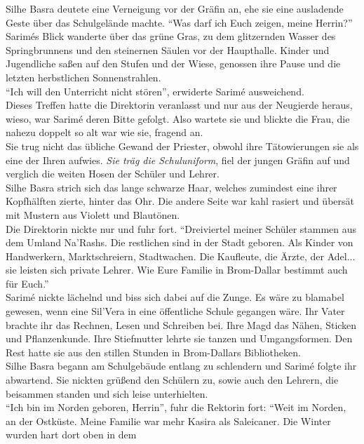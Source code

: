 Silhe Basra deutete eine Verneigung vor der Gräfin an, ehe sie eine ausladende Geste über das 
Schulgelände machte. ``Was darf ich Euch zeigen, meine Herrin?''\\
Sarimés Blick wanderte über das grüne Gras, zu dem glitzernden Wasser des Springbrunnens und den 
steinernen Säulen vor der Haupthalle. Kinder und Jugendliche saßen auf den Stufen und der Wiese, 
genossen ihre Pause und die letzten herbstlichen Sonnenstrahlen.\\
``Ich will den Unterricht nicht stören'', erwiderte Sarimé ausweichend.\\
Dieses Treffen hatte die Direktorin veranlasst und nur aus der Neugierde heraus, wieso, war Sarimé 
deren Bitte gefolgt. Also wartete sie und blickte die Frau, die nahezu doppelt so alt war wie sie, 
fragend an.\\
Sie trug nicht das übliche Gewand der Priester, obwohl ihre Tätowierungen sie als eine der Ihren 
aufwies. \textit{Sie träg die Schuluniform}, fiel der jungen Gräfin auf und verglich die weiten 
Hosen der Schüler und Lehrer.\\
Silhe Basra strich sich das lange schwarze Haar, welches zumindest eine ihrer Kopfhälften zierte, 
hinter das Ohr. Die andere Seite war kahl rasiert und übersät mit Mustern aus Violett und 
Blautönen.\\
Die Direktorin nickte nur und fuhr fort. ``Dreiviertel meiner Schüler stammen aus dem Umland 
Na'Rashs. Die restlichen sind in der Stadt geboren. Als Kinder von Handwerkern, Marktschreiern, 
Stadtwachen. Die Kaufleute, die Ärzte, der Adel... sie leisten sich private Lehrer. Wie Eure 
Familie in Brom-Dallar bestimmt auch für Euch.''\\
Sarimé nickte lächelnd und biss sich dabei auf die Zunge. Es wäre zu blamabel gewesen, wenn eine 
Sil'Vera in eine öffentliche Schule gegangen wäre. Ihr Vater brachte ihr das Rechnen, Lesen und 
Schreiben bei. Ihre Magd das Nähen, Sticken und Pflanzenkunde. Ihre Stiefmutter lehrte sie 
tanzen und Umgangsformen. Den Rest hatte sie aus den stillen Stunden in Brom-Dallars Bibliotheken.\\
Silhe Basra begann am Schulgebäude entlang zu schlendern und Sarimé folgte ihr abwartend. Sie 
nickten grüßend den Schülern zu, sowie auch den Lehrern, die beisammen standen und sich leise 
unterhielten.\\
``Ich bin im Norden geboren, Herrin'', fuhr die Rektorin fort: ``Weit im Norden, an der Ostküste. 
Meine Familie war mehr Kasira als Saleicaner. Die Winter wurden hart dort oben in dem 
